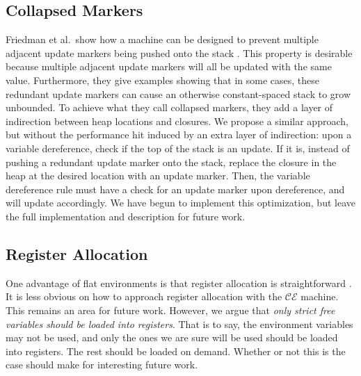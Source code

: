 \subsection{Collapsed Markers}
Friedman et al.\ show how a machine can be designed to prevent multiple adjacent
update markers being pushed onto the stack \cite{lkm}.  This property is
desirable because multiple adjacent update markers will all be updated with the
same value. Furthermore, they give examples showing that in some cases, these
redundant update markers can cause an otherwise constant-spaced stack to grow
unbounded. To achieve what they call collapsed markers, they add a layer
of indirection between heap locations and closures. We propose a similar
approach, but without the performance hit induced by an extra layer of
indirection: upon a variable dereference, check if the top of the stack is an
update. If it is, instead of pushing a redundant update marker onto the stack,
replace the closure in the heap at the desired location with an update marker.
Then, the variable dereference rule must have a check for an update marker upon
dereference, and will update accordingly. We have begun to implement this
optimization, but leave the full implementation and description for future work.

\subsection{Register Allocation} \label{sec:alloc}
One advantage of flat environments is that register allocation is
straightforward \cite{appel2006compiling,jonesstg,terei2010llvm}. It is less
obvious on how to approach register allocation with the $\mathcal{CE}$ machine.
This remains an area for future work. However, we argue that \emph{only strict
free variables should be loaded into registers}. That is to say, the environment
variables may not be used, and only the ones we are sure will be used should be
loaded into registers. The rest should be loaded on demand. Whether or not this
is the case should make for interesting future work.

